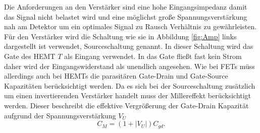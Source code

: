 Die Anforderungen an den Verstärker sind eine hohe Eingangsimpedanz damit das Signal nicht belastet wird und eine möglichst große Spannungsverstärkung nah am Detektor um ein optimales Signal zu Rausch Verhältnis zu gewährleisten.
Für den Verstärker wird die Schaltung wie sie in Abbildung \ref{fig:Amp} links dargestellt ist verwendet, Sourceschaltung\cite{Tietze2002} genannt.
In dieser Schaltung wird das Gate des HEMT $T$ als Eingang verwendet.
In das Gate fließt fast kein Strom daher wird der Eingangswiderstand als unendlich angesehen.
Wie bei FETs müss allerdings auch bei HEMTs die parasitären Gate-Drain und Gate-Source Kapazitäten berücksichtigt werden.
Da es sich bei der Sourceschaltung zusätzlich um einen invertierenden Verstärker handelt muss der Millereffekt berücksichtigt werden.
Dieser beschreibt die effektive Vergrößerung der Gate-Drain Kapazität aufgrund der Spannungsverstärkung $V_U$
\begin{equation}
C_M = (1+ |V_U|)C_{gd}.
\end{equation}
